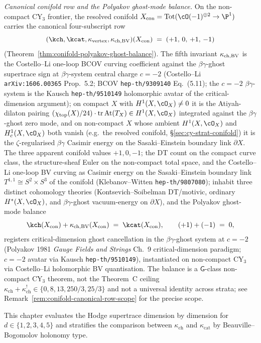 \emph{Canonical conifold row and the Polyakov ghost-mode balance.}
On the non-compact CY$_3$ frontier, the resolved conifold
$X_{\mathrm{con}} = \mathrm{Tot}(\cO(-1)^{\oplus 2} \to \P^1)$
carries the canonical four-subscript row
\[
 (\kch, \kcat, \kappa_{\mathrm{vertex}}, \kchBV)(X_{\mathrm{con}})
 \;=\; (+1,\,0,\,+1,\,-1)
\]
(Theorem~\ref{thm:conifold-polyakov-ghost-balance}). The fifth
invariant $\kappa_{\mathrm{ch,BV}}$ is the Costello--Li one-loop BCOV curving
coefficient against the $\beta\gamma$-ghost supertrace sign at
$\beta\gamma$-system central charge $c = -2$ \textup{(}Costello--Li
\texttt{arXiv:1606.00365} Prop.~5.2; BCOV \texttt{hep-th/9309140}
Eq.~(5.11); the $c = -2$ $\beta\gamma$-system is the Kausch
\texttt{hep-th/9510149} holomorphic avatar of the
critical-dimension argument\textup{);} on compact $X$ with
$H^1(X, \cO_X) \neq 0$ it is the Atiyah-dilaton pairing
$(\chi_{\mathrm{top}}(X)/24) \cdot \mathrm{tr}\,\mathrm{At}(T_X)
\in H^1(X, \cO_X)$ integrated against the $\beta\gamma$-ghost
zero mode, and on non-compact $X$ whose ambient $H^1(X, \cO_X)$
and $H^1_c(X, \cO_X)$ both vanish (e.g.\ the resolved conifold,
\S\ref{sec:cy-strat-conifold}) it is the
$\zeta$-regularised $\beta\gamma$ Casimir energy on the
Sasaki--Einstein boundary link $\partial X$. The three
apparent conifold values $+1, 0, -1$; the DT count on the
compact curve class, the structure-sheaf Euler on the non-compact
total space, and the Costello--Li one-loop BV curving as Casimir
energy on the Sasaki--Einstein boundary link $T^{1, 1} \cong S^2
\times S^3$ of the conifold (Klebanov--Witten
\texttt{hep-th/9807080}); inhabit three distinct cohomology
theories \textup{(}Kontsevich--Soibelman DT/motivic, ordinary
$H^*(X, \cO_X)$, and $\beta\gamma$-ghost vacuum-energy on
$\partial X$\textup{),} and the Polyakov ghost-mode balance
\[
 \kch(X_{\mathrm{con}}) + \kchBV(X_{\mathrm{con}})
 \;=\; \kcat(X_{\mathrm{con}}),
 \qquad (+1) + (-1) \;=\; 0,
\]
registers critical-dimension ghost cancellation in the
$\beta\gamma$-ghost system at $c = -2$ (Polyakov 1981
\emph{Gauge Fields and Strings} Ch.~9 critical-dimension
paradigm; $c = -2$ avatar via Kausch
\texttt{hep-th/9510149}\textup{)}, instantiated on non-compact
CY$_3$ via Costello--Li holomorphic BV quantisation. The balance
is a $\mathsf G$-class non-compact CY$_3$ theorem, not the
Theorem~C ceiling $\kappa_{\mathrm{ch}} + \kappa_{\mathrm{ch}}^!
\in \{0, 8, 13, 250/3, 25/3\}$ and not a universal identity
across strata; see
Remark~\ref{rem:conifold-canonical-row-scope} for the precise
scope.

This chapter evaluates the Hodge supertrace dimension by dimension for
$d \in \{1, 2, 3, 4, 5\}$ and stratifies the comparison between
$\kappa_{\mathrm{ch}}$ and $\kappa_{\mathrm{cat}}$ by Beauville--Bogomolov
holonomy type.

